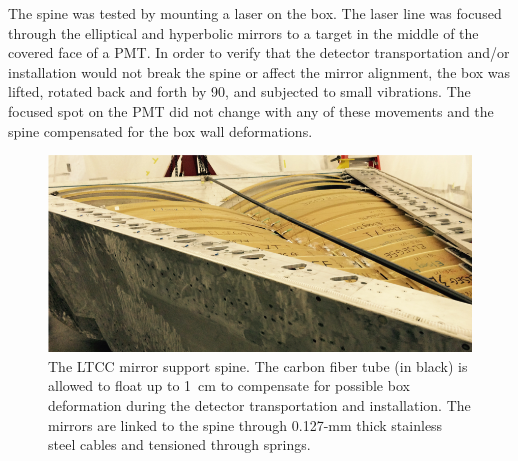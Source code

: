 The spine was tested by mounting a laser on the box. The laser line was focused through the elliptical and hyperbolic
mirrors to a target in the middle of the covered face of a PMT. In order to verify that the detector transportation
and/or installation would not break the spine or affect the mirror alignment, the box was lifted, rotated back and
forth by 90\mdeg, and subjected to small vibrations. The focused spot on the PMT did not change with any of these
movements and the spine compensated for the box wall deformations.

\begin{figure}[b]
	\centering
	\includegraphics[width=1.0\columnwidth,keepaspectratio]{img/spine.png}
	\caption{The LTCC mirror support spine. The carbon fiber tube (in black) is allowed to float up to 1~cm to
          compensate for possible box deformation during the detector transportation and installation. The mirrors
          are linked to the spine through 0.127-mm thick stainless steel cables and tensioned through springs.}
	\label{fig:spine}
\end{figure}

